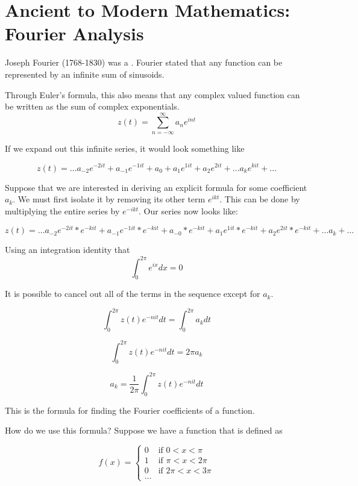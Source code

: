 \section{Ancient to Modern Mathematics: Fourier Analysis}

Joseph Fourier (1768-1830) was a . Fourier stated that any function can be represented by an infinite sum of sinusoids.

Through Euler's formula, this also means that any complex valued function can be written as the sum of complex exponentials.
 $$z(t)=\sum_{n=-\infty}^{\infty} a_n e^{int}$$
 
 If we expand out this infinite series, it would look something like

 $$ z(t) = \ldots a_{-2}e^{-2it} +  a_{-1}e^{-1it} + a_{0} + a_{1}e^{1it} + a_{2}e^{2it} + \ldots a_{k}e^{kit} + \ldots $$ 
 


Suppose that we are interested in deriving an explicit formula for some coefficient $a_k$. We must first isolate it by removing its other term $e^{ikt}$. This can be done by multiplying the entire series by $e^{-ikt}$. Our series now looks like:

 $$ z(t) = \ldots a_{-2}e^{-2it}*e^{-kit} +  a_{-1}e^{-1it}*e^{-kit} + a_{-0}*e^{-kit} + a_{1}e^{1it}*e^{-kit} + a_{2}e^{2it}*e^{-kit} + \ldots a_{k} + \ldots $$ 
 


Using an integration identity that $$\int_{0}^{2\pi} e^{ix} dx = 0$$	

It is possible to cancel out all of the terms in the sequence except for $a_{k}$. 

$$ \int_{0}^{2\pi}z(t)e^{-nit} dt = \int_{0}^{2\pi}a_k  dt$$

$$ \int_{0}^{2\pi}z(t)e^{-nit} dt = 2\pi a_k $$

$$ a_k = \frac{1}{2\pi}\int_{0}^{2\pi}z(t)e^{-nit} dt  $$

This is the formula for finding the Fourier coefficients of a function.

How do we use this formula? Suppose we have a function that is defined as 
\begin{center}
\begin{equation*}
      f(x) =
  \begin{cases}                               0 & \text{if $0 < x < \pi$} \\
                                   1 & \text{if $\pi < x < 2\pi$} \\
  0 & \text{if $2\pi < x < 3\pi$} \\
  \dots
  \end{cases}
\end{equation*}

\end{center}

